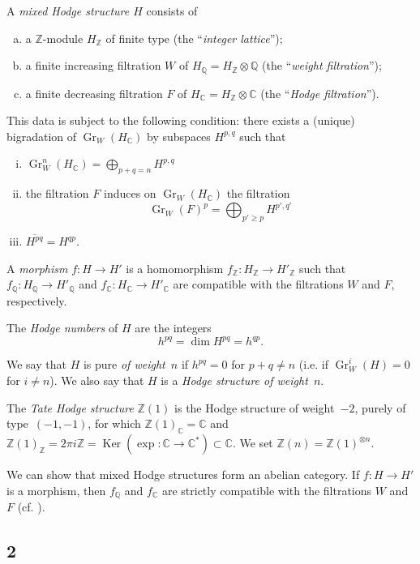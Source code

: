 \documentclass{article}
\theoremstyle{plain}
\theoremstyle{definition}
\newenvironment{definition}[1]
    {\renewcommand\theinnercustomdefinition{#1}\innercustomdefinition}
    {\endinnercustomdefinition}
\newcommand{\ZZ}{\mathbb{Z}}
\newcommand{\QQ}{\mathbb{Q}}
\newcommand{\CC}{\mathbb{C}}
\DeclareMathOperator{\Gr}{Gr}
\DeclareMathOperator{\Ker}{Ker}
\renewcommand{\geq}{\geqslant}
\begin{document}
\begin{definition}{1.1}
  A \emph{mixed Hodge structure $H$} consists of
  \begin{enumerate}[(a)]
    \item a $\ZZ$-module $H_\ZZ$ of finite type (the ``\emph{integer lattice}'');
    \item a finite increasing filtration $W$ of $H_\QQ = H_\ZZ\otimes\QQ$ (the ``\emph{weight filtration}'');
    \item a finite decreasing filtration $F$ of $H_\CC = H_\ZZ\otimes\CC$ (the ``\emph{Hodge filtration}'').
  \end{enumerate}
  This data is subject to the following condition:
  there exists a (unique) bigradation of $\Gr_W(H_\CC)$ by subspaces $H^{p,q}$ such that
  \begin{enumerate}[(i)]
    \item $\Gr_W^n(H_\CC) = \bigoplus_{p+q=n}H^{p,q}$
    \item the filtration $F$ induces on $\Gr_W(H_\CC)$ the filtration
      \[
        \Gr_W(F)^p = \bigoplus_{p'\geq p} H^{p',q'}
      \]
    \item $\overline{H^{pq}}=H^{qp}$.
  \end{enumerate}
\end{definition}

A \emph{morphism} $f\colon H\to H'$ is a homomorphism $f_\ZZ\colon H_\ZZ\to H'_\ZZ$ such that $f_\QQ\colon H_\QQ\to H'_\QQ$ and $f_\CC\colon H_\CC\to H'_\CC$ are compatible with the filtrations $W$ and $F$, respectively.

The \emph{Hodge numbers} of $H$ are the integers
\[
  h^{pq} = \dim H^{pq} = h^{qp}.
\tag{1.2}
\]

We say that $H$ is pure \emph{of weight~$n$} if $h^{pq}=0$ for $p+q\neq n$ (i.e. if $\Gr_W^i(H)=0$ for $i\neq n$).
We also say that $H$ is a \emph{Hodge structure of weight~$n$}.

The \emph{Tate Hodge structure} $\ZZ(1)$ is the Hodge structure of weight~$-2$, purely of type~$(-1,-1)$, for which $\ZZ(1)_\CC=\CC$ and $\ZZ(1)_\ZZ = 2\pi i\ZZ = \Ker(\exp\colon\CC\to\CC^*)\subset\CC$.
We set $\ZZ(n)=\ZZ(1)^{\otimes n}$.

We can show that mixed Hodge structures form an abelian category.
If $f\colon H\to H'$ is a morphism, then $f_\QQ$ and $f_\CC$ are strictly compatible with the filtrations $W$ and $F$ (cf. \cite[2.3.5]{1}).


\subsection*{2}
\end{document}

